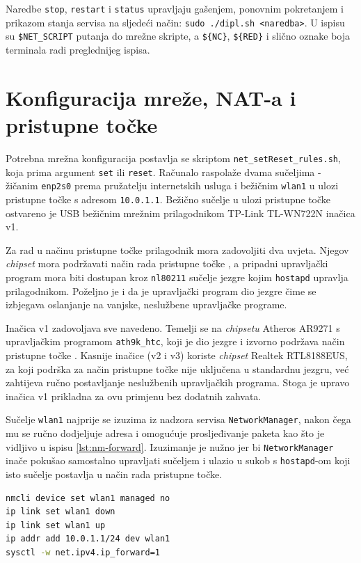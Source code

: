 Naredbe \texttt{stop}, \texttt{restart} i \texttt{status} upravljaju gašenjem, ponovnim pokretanjem i prikazom stanja servisa na sljedeći način: \texttt{sudo ./dipl.sh <naredba>}.
U ispisu su \lstinline|$NET_SCRIPT| putanja do mrežne skripte, a \lstinline|${NC}|, \lstinline|${RED}| i slično oznake boja terminala radi preglednijeg ispisa.
\section{Konfiguracija mreže, NAT-a i pristupne točke}

Potrebna mrežna konfiguracija postavlja se skriptom \texttt{net\_setReset\_rules.sh}, koja prima argument \texttt{set} ili \texttt{reset}. Računalo raspolaže dvama sučeljima - žičanim
\texttt{enp2s0} prema pružatelju internetskih usluga i bežičnim \texttt{wlan1} u ulozi pristupne točke s adresom \texttt{10.0.1.1}. Bežično sučelje u ulozi pristupne točke ostvareno je 
USB bežičnim mrežnim prilagodnikom TP-Link TL-WN722N inačica v1.

Za rad u načinu pristupne točke prilagodnik mora zadovoljiti dva uvjeta. Njegov \textit{chipset} mora podržavati način rada pristupne točke , a pripadni upravljački
program mora biti dostupan kroz \texttt{nl80211} sučelje jezgre kojim \texttt{hostapd} upravlja prilagodnikom. Poželjno je i da je upravljački program dio jezgre čime se izbjegava
oslanjanje na vanjske, neslužbene upravljačke programe.

Inačica v1 zadovoljava sve navedeno. Temelji se na \textit{chipsetu} Atheros AR9271 s upravljačkim programom \texttt{ath9k\_htc}, koji je dio jezgre i izvorno podržava način
pristupne točke \cite{wikidevi_wn722n}. Kasnije inačice (v2 i v3) koriste \textit{chipset} Realtek RTL8188EUS, za koji podrška za način pristupne točke nije uključena u standardnu jezgru, 
već zahtijeva ručno postavljanje neslužbenih upravljačkih programa. Stoga je upravo inačica v1 prikladna za ovu primjenu bez dodatnih zahvata.

Sučelje \texttt{wlan1} najprije se izuzima iz nadzora servisa \texttt{NetworkManager}, nakon čega mu se ručno dodjeljuje adresa i omogućuje prosljeđivanje paketa kao što je vidljivo
u ispisu \ref{lst:nm-forward}. Izuzimanje je nužno jer bi \texttt{NetworkManager} inače pokušao samostalno upravljati sučeljem i ulazio u sukob s \texttt{hostapd}-om koji isto sučelje
postavlja u način rada pristupne točke.

\begin{lstlisting}[language=bash, caption={Izuzimanje sučelja i omogućavanje usmjeravanja}, label={lst:nm-forward}]
nmcli device set wlan1 managed no
ip link set wlan1 down
ip link set wlan1 up
ip addr add 10.0.1.1/24 dev wlan1
sysctl -w net.ipv4.ip_forward=1
\end{lstlisting}

